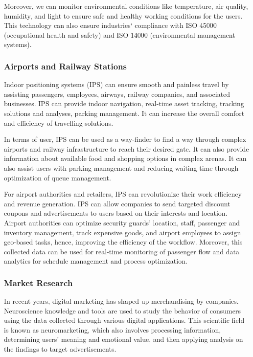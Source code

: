 \documentclass[a4paper,singleside,12pt]{report} %
\begin{document}
				Moreover, we can monitor environmental conditions like temperature, air quality, humidity, and light to ensure safe and healthy working conditions for the users. 
				This technology can also ensure industries` compliance with ISO 45000 (occupational health and safety) and ISO 14000 (environmental management systems).
				
				\subsubsection{Airports and Railway Stations}

					Indoor positioning systems (IPS) can ensure smooth and painless travel by assisting passengers, employees, airways, railway companies, and associated businesses. 
					IPS can provide indoor navigation, real-time asset tracking, tracking solutions and analyses, parking management. 
					It can increase the overall comfort and efficiency of travelling solutions.
					
					In terms of user, IPS can be used as a way-finder to find a way through complex airports and railway infrastructure to reach their desired gate. 
					It can also provide information about available food and shopping options in complex arenas. 
					It can also assist users with parking management and reducing waiting time through optimization of queue management. 
					
					For airport authorities and retailers, IPS can revolutionize their work efficiency and revenue generation.
					IPS can allow companies to send targeted discount coupons and advertisements to users based on their interests and location. 
					Airport authorities can optimize security guards' location, staff, passenger and inventory management, track expensive goods, and airport employees to assign geo-based tasks, hence, improving the efficiency of the workflow. 
					Moreover, this collected data can be used for real-time monitoring of passenger flow and data analytics for schedule management and process optimization. 

				\subsubsection{Market Research}

					In recent years, digital marketing has shaped up merchandising by companies. 
					Neuroscience knowledge and tools are used to study the behavior of consumers using the data collected through various digital applications. 
					This scientific field is known as neuromarketing, which also involves processing information, determining users' meaning and emotional value, and then applying analysis on the findings to target advertisements. 
					
\end{document}
